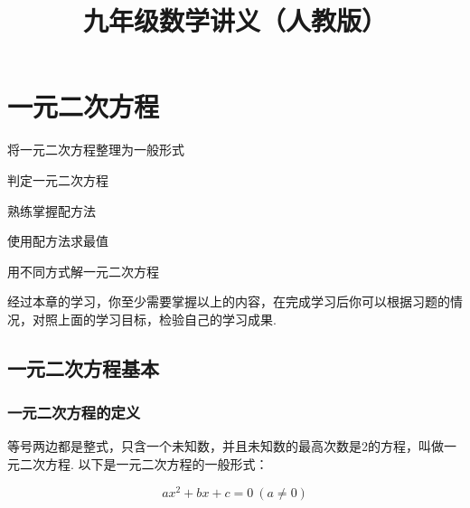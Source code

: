 \documentclass[lang=cn, 10pt, titlestyle=hang, oneside]{elegantbook}
\title{九年级数学讲义（人教版）}
\begin{document}
\tableofcontents

\chapter{一元二次方程}



\begin{introduction}[本章学习目标]

\item 将一元二次方程整理为一般形式
\item 判定一元二次方程
\item 熟练掌握配方法
\item 使用配方法求最值
\item 用不同方式解一元二次方程

\end{introduction}

经过本章的学习，你至少需要掌握以上的内容，在完成学习后你可以根据习题的情况，对照上面的学习目标，检验自己的学习成果.

\section{一元二次方程基本}
\subsection{一元二次方程的定义}


\begin{definition}
  
等号两边都是整式，只含一个未知数，并且未知数的最高次数是2的方程，叫做一元二次方程. 以下是一元二次方程的一般形式：

\begin{equation}
    ax^2 + bx + c = 0 \ (a \neq 0)
    \label{general_formula}
\end{equation}

 
\end{definition}
\end{document}
